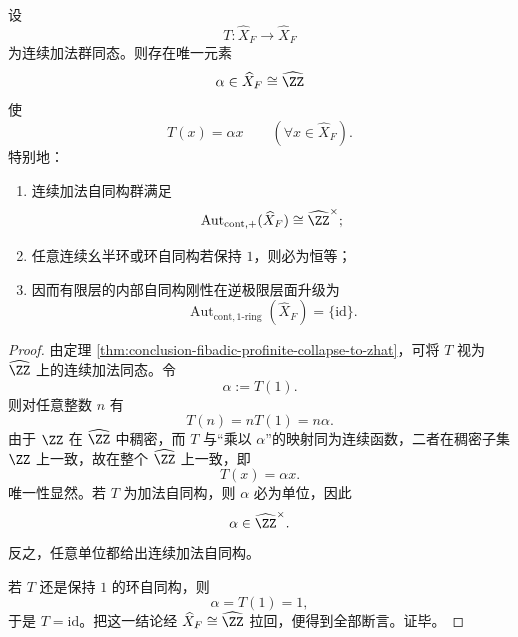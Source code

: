 \begin{theorem}[全局地址完成的连续自同态分类]\label{thm:conclusion-fibadic-global-continuous-endomorphism-classification}
设
\[
T:\widehat X_F\longrightarrow \widehat X_F
\]
为连续加法群同态。则存在唯一元素
\[
\alpha\in \widehat X_F\cong \widehat{\ZZ}
\]
使
\[
T(x)=\alpha x
\qquad
(\forall x\in \widehat X_F).
\]
特别地：
\begin{enumerate}
  \item 连续加法自同构群满足
  \[
  \operatorname{Aut}_{\mathrm{cont},+}(\widehat X_F)\cong \widehat{\ZZ}^{\times};
  \]
  \item 任意连续幺半环或环自同构若保持 \(1\)，则必为恒等；
  \item 因而有限层的内部自同构刚性在逆极限层面升级为
  \[
  \operatorname{Aut}_{\mathrm{cont},1\text{-ring}}(\widehat X_F)=\{\mathrm{id}\}.
  \]
\end{enumerate}
\end{theorem}
\begin{proof}
由定理 \ref{thm:conclusion-fibadic-profinite-collapse-to-zhat}，可将 \(T\) 视为 \(\widehat{\ZZ}\) 上的连续加法同态。令
\[
\alpha:=T(1).
\]
则对任意整数 \(n\) 有
\[
T(n)=nT(1)=n\alpha.
\]
由于 \(\ZZ\) 在 \(\widehat{\ZZ}\) 中稠密，而 \(T\) 与“乘以 \(\alpha\)”的映射同为连续函数，二者在稠密子集 \(\ZZ\) 上一致，故在整个 \(\widehat{\ZZ}\) 上一致，即
\[
T(x)=\alpha x.
\]
唯一性显然。若 \(T\) 为加法自同构，则 \(\alpha\) 必为单位，因此
\[
\alpha\in \widehat{\ZZ}^{\times}.
\]
反之，任意单位都给出连续加法自同构。

若 \(T\) 还是保持 \(1\) 的环自同构，则
\[
\alpha=T(1)=1,
\]
于是 \(T=\mathrm{id}\)。把这一结论经 \(\widehat X_F\cong \widehat{\ZZ}\) 拉回，便得到全部断言。证毕。
\end{proof}

